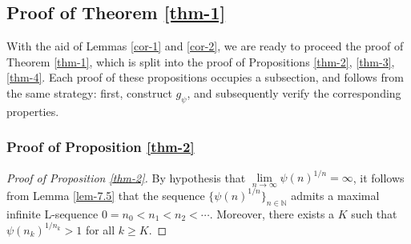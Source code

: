 \documentclass[12pt,reqno]{amsart}
\renewcommand{\=}{\coloneqq}
\theoremstyle{plain}
\begin{document}
\subsection{Proof of Theorem \ref{thm-1}}
With the aid of Lemmas \ref{cor-1} and \ref{cor-2}, we are ready to proceed the proof of Theorem \ref{thm-1}, which is split into the proof of Propositions \ref{thm-2}, \ref{thm-3}, \ref{thm-4}. Each proof of these propositions occupies a subsection, and follows from the same strategy: first, construct $g_\psi$, and subsequently verify the corresponding properties.

\subsubsection{Proof of Proposition \ref{thm-2}}
\begin{proof}[Proof of Proposition \ref{thm-2}]
By hypothesis that $\lim\limits_{n\to\infty}{\psi(n)}^{1/n}=\infty$, it follows from Lemma \ref{lem-7.5} that the sequence $\{{\psi(n)}^{1/n}\}_{n\in\mathbb{N}}$ admits a maximal infinite L-sequence $0=n_{0}<n_1 < n_2 < \cdots$. Moreover, there exists a $K$ such that ${\psi(n_k)}^{1/n_k}>1$ for all $k\geq K$.
			

\end{proof}
\end{document}
